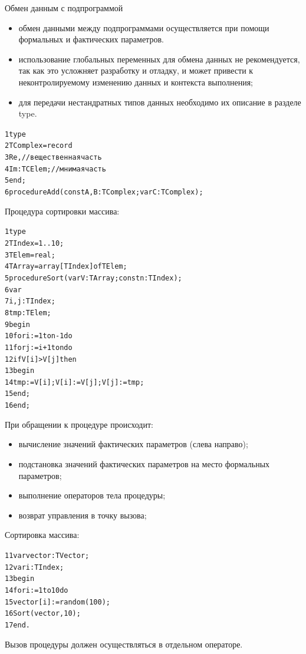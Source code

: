 \documentclass{beamer}
\begin{document}
\begin{frame}[fragile]{Обмен данным с подпрограммой}
\begin{itemize}
\item обмен данными между подпрограммами осуществляется при помощи формальных и фактических параметров.
\item использование глобальных переменных для обмена данных не рекомендуется, так как это усложняет разработку и отладку, и может привести к неконтролируемому изменению данных и контекста выполнения;
\item для передачи нестандратных типов данных необходимо их описание в разделе type.
\end{itemize}
\begin{alltt}
1 type
2   TComplex = record
3     Re, //вещественная часть
4     Im: TСElem; //мнимая часть
5   end;
6 procedure Add(const A, B: TComplex; var C: TComplex); 
\end{alltt}
\end{frame}

\begin{frame}[fragile]
Процедура сортировки массива:
\begin{alltt}
1 type
2   TIndex = 1..10;
3   TElem = real;
4   TArray = array[TIndex] of TElem;
5 procedure Sort(var V:TArray; const n:TIndex); 
6 var
7   i, j: TIndex;
8   tmp:  TElem;
9 begin
10  for i := 1 to n-1 do
11    for j := i + 1 to n do
12      if V[i] > V[j] then
13      begin
14        tmp := V[i]; V[i] := V[j]; V[j] := tmp;
15      end;
16 end;
\end{alltt}
\end{frame}

\begin{frame}[fragile]
При обращении к процедуре происходит:
\begin{itemize}
\item вычисление значений фактических параметров (слева направо);
\item подстановка значений фактических параметров на место формальных параметров;
\item выполнение операторов тела процедуры;
\item возврат управления в точку вызова;
\end{itemize}
Сортировка массива:
\begin{alltt}
11 var vector: TVector; 
12 var i: TIndex; 
13 begin
14   for i := 1 to 10 do
15      vector[i] := random(100);
16   Sort(vector, 10);
17 end.
\end{alltt}
Вызов процедуры должен осуществляться в отдельном операторе.
\end{frame}
\end{document}
